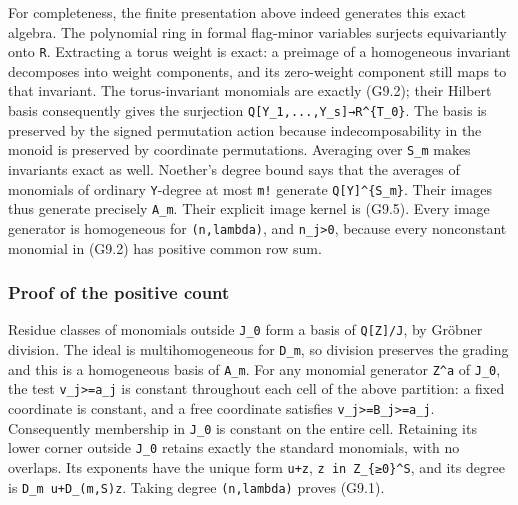 \documentclass[
  10pt,
]{article}
\begin{document}
For completeness, the finite presentation above indeed generates this
exact algebra. The polynomial ring in formal flag-minor variables
surjects equivariantly onto \texttt{\small R}. Extracting a torus weight
is exact: a preimage of a homogeneous invariant decomposes into weight
components, and its zero-weight component still maps to that invariant.
The torus-invariant monomials are exactly (G9.2); their Hilbert basis
consequently gives the surjection
\texttt{\small Q[\allowbreak{}Y\_\allowbreak{}1,\allowbreak{}...,\allowbreak{}Y\_\allowbreak{}s]\allowbreak{}→\allowbreak{}R\textasciicircum{}\{T\_\allowbreak{}0\}}.
The basis is preserved by the signed permutation action because
indecomposability in the monoid is preserved by coordinate permutations.
Averaging over \texttt{\small S\_\allowbreak{}m} makes invariants exact
as well. Noether's degree bound says that the averages of monomials of
ordinary \texttt{\small Y}-degree at most \texttt{\small m!} generate
\texttt{\small Q[\allowbreak{}Y]\allowbreak{}\textasciicircum{}\{S\_\allowbreak{}m\}}.
Their images thus generate precisely \texttt{\small A\_\allowbreak{}m}.
Their explicit image kernel is (G9.5). Every image generator is
homogeneous for
\texttt{\small (\allowbreak{}n,\allowbreak{}lambda)\allowbreak{}}, and
\texttt{\small n\_\allowbreak{}j>0}, because every nonconstant monomial
in (G9.2) has positive common row sum.

\subsubsection{Proof of the positive
count}\label{proof-of-the-positive-count}

Residue classes of monomials outside \texttt{\small J\_\allowbreak{}0}
form a basis of
\texttt{\small Q[\allowbreak{}Z]\allowbreak{}/\allowbreak{}J}, by
Gröbner division. The ideal is multihomogeneous for
\texttt{\small D\_\allowbreak{}m}, so division preserves the grading and
this is a homogeneous basis of \texttt{\small A\_\allowbreak{}m}. For
any monomial generator \texttt{\small Z\textasciicircum{}a} of
\texttt{\small J\_\allowbreak{}0}, the test
\texttt{\small v\_\allowbreak{}j>=\allowbreak{}a\_\allowbreak{}j} is
constant throughout each cell of the above partition: a fixed coordinate
is constant, and a free coordinate satisfies
\texttt{\small v\_\allowbreak{}j>=\allowbreak{}B\_\allowbreak{}j>=\allowbreak{}a\_\allowbreak{}j}.
Consequently membership in \texttt{\small J\_\allowbreak{}0} is constant
on the entire cell. Retaining its lower corner outside
\texttt{\small J\_\allowbreak{}0} retains exactly the standard
monomials, with no overlaps. Its exponents have the unique form
\texttt{\small u+\allowbreak{}z},
\texttt{\small z in Z\_\allowbreak{}\{≥\allowbreak{}0\}\textasciicircum{}S},
and its degree is
\texttt{\small D\_\allowbreak{}m u+\allowbreak{}D\_\allowbreak{}(\allowbreak{}m,\allowbreak{}S)\allowbreak{}z}.
Taking degree
\texttt{\small (\allowbreak{}n,\allowbreak{}lambda)\allowbreak{}} proves
(G9.1).
\end{document}
